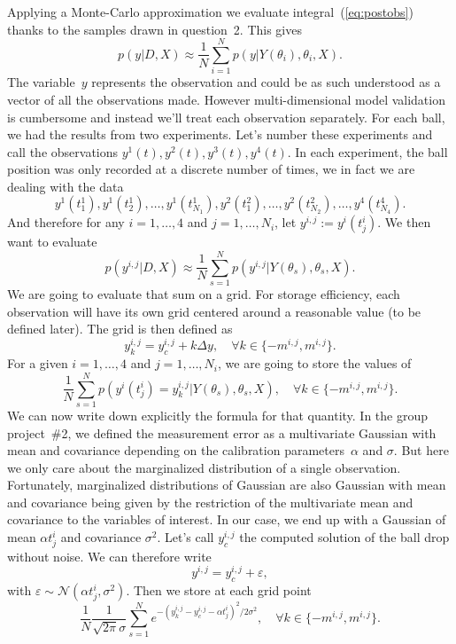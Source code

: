\documentclass{article}
\begin{document}
Applying a Monte-Carlo approximation we evaluate integral~(\ref{eq:postobs})
thanks to the samples drawn in question~2. This gives 
\begin{equation}
p(y|D,X)\approx\frac{1}{N}\sum_{i=1}^{N}p(y|Y(\theta_{i}),\theta_{i},X).\label{eq:postobsmc}
\end{equation}
 The variable~$y$ represents the observation and could be as such
understood as a vector of all the observations made. However multi-dimensional
model validation is cumbersome and instead we'll treat each observation
separately. For each ball, we had the results from two experiments.
Let's number these experiments and call the observations $y^{1}(t),y^{2}(t),y^{3}(t),y^{4}(t)$.
In each experiment, the ball position was only recorded at a discrete
number of times, we in fact we are dealing with the data 
\[
y^{1}(t_{1}^{1}),y^{1}(t_{2}^{1}),\ldots,y^{1}(t_{N_{1}}^{1}),y^{2}(t_{1}^{2}),\ldots,y^{2}(t_{N_{2}}^{2}),\ldots,y^{4}(t_{N_{4}}^{4}).
\]
 And therefore for any $i=1,\ldots,4$ and $j=1,\ldots,N_{i}$, let
$y^{i,j}:=y^{i}(t_{j}^{i})$. We then want to evaluate 
\[
p(y^{i,j}|D,X)\approx\frac{1}{N}\sum_{s=1}^{N}p(y^{i,j}|Y(\theta_{s}),\theta_{s},X).
\]
 We are going to evaluate that sum on a grid. For storage efficiency,
each observation will have its own grid centered around a reasonable
value (to be defined later). The grid is then defined as 
\[
y_{k}^{i,j}=y_{c}^{i,j}+k\Delta y,\quad\forall k\in\{-m^{i,j},m^{i,j}\}.
\]
 For a given $i=1,\ldots,4$ and $j=1,\ldots,N_{i}$, we are going
to store the values of 
\[
\frac{1}{N}\sum_{s=1}^{N}p(y^{i}(t_{j}^{i})=y_{k}^{i,j}|Y(\theta_{s}),\theta_{s},X),\quad\forall k\in\{-m^{i,j},m^{i,j}\}.
\]
 We can now write down explicitly the formula for that quantity. In
the group project~\#2, we defined the measurement error as a multivariate
Gaussian with mean and covariance depending on the calibration parameters~$\alpha$
and $\sigma$. But here we only care about the marginalized distribution
of a single observation. Fortunately, marginalized distributions of
Gaussian are also Gaussian with mean and covariance being given by
the restriction of the multivariate mean and covariance to the variables
of interest. In our case, we end up with a Gaussian of mean $\alpha t_{j}^{i}$
and covariance $\sigma^{2}$. Let's call $y_{c}^{i,j}$ the computed
solution of the ball drop without noise. We can therefore write 
\[
y^{i,j}=y_{c}^{i,j}+\varepsilon,
\]
 with $\varepsilon\sim\mathcal{N}(\alpha t_{j}^{i},\sigma^{2})$.
Then we store at each grid point 
\[
\frac{1}{N}\frac{1}{\sqrt{2\pi}\sigma}\sum_{s=1}^{N}e^{-(y_{k}^{i,j}-y_{c}^{i,j}-\alpha t_{j}^{i})^{2}/2\sigma^{2}},\quad\forall k\in\{-m^{i,j},m^{i,j}\}.
\]
\end{document}
